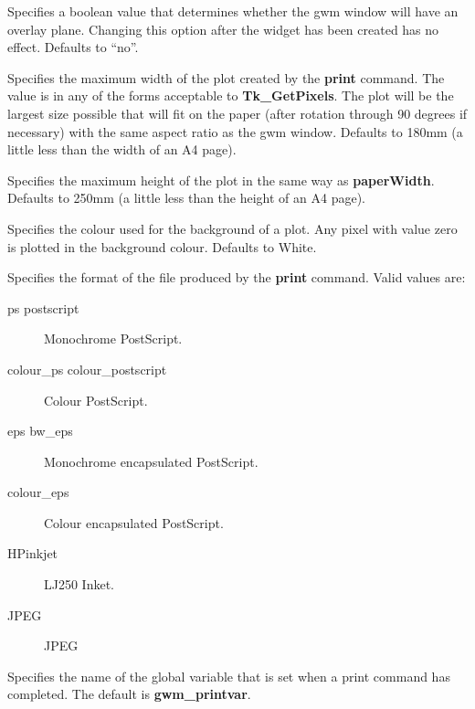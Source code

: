 \begin{rquote}
Specifies a boolean value that determines whether the gwm window will have
an overlay plane.  Changing this option after the widget
has been created has no effect. Defaults to ``no''.
\end{rquote}

\begin{rquote}
Specifies the maximum width of the plot created by the {\bf print} command. 
The value is in any of the forms acceptable to {\bf Tk\_GetPixels}. The 
plot will be the largest size possible that will fit on the paper (after
rotation through 90 degrees if necessary) with the same aspect ratio
as the gwm window. Defaults to 180mm (a little less than the width of an
A4 page).
\end{rquote}

\begin{rquote}
Specifies the maximum height of the plot in the same way as {\bf paperWidth}.
Defaults to 250mm (a little less than the height of an A4 page).
\end{rquote}

\begin{rquote}
Specifies the colour used for the background of a plot. Any pixel with
value zero is plotted in the background colour. Defaults to White.
\end{rquote}

\begin{rquote}
Specifies the format of the file produced by the {\bf print} command. Valid 
values are:
\begin{description}
\item[ps postscript] Monochrome PostScript.
\item[colour\_ps colour\_postscript] Colour PostScript.
\item[eps bw\_eps] Monochrome encapsulated PostScript.
\item[colour\_eps] Colour encapsulated PostScript.
\item[HPinkjet] LJ250 Inket.
\item[JPEG] JPEG
\end{description}
\end{rquote}

\begin{rquote}
Specifies the name of the global variable that is set when a print command
has completed. The default is {\bf gwm\_printvar}.
\end{rquote}


